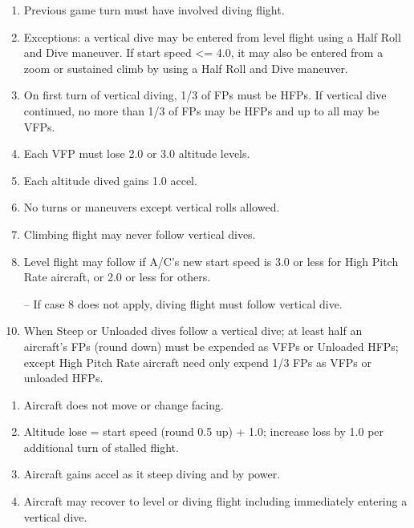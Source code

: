 \begin{table*}
\begin{multicols}{2}

\begin{enumerate}[nosep]
    \item Previous game turn must have involved diving flight.
    \item Exceptions: a vertical dive may be entered from level flight using a Half Roll and Dive maneuver. If start speed <= 4.0, it may also be entered from a zoom or sustained climb by using a Half Roll and Dive maneuver.
    \item On first turn of vertical diving, 1/3 of FPs must be HFPs. If vertical dive continued, no more than 1/3 of FPs may be HFPs and up to all may be VFPs.
    \item Each VFP must lose 2.0 or 3.0 altitude levels.
    \item Each altitude dived gains 1.0 accel.
    \item No turns or maneuvers except vertical rolls allowed.
    \item Climbing flight may never follow vertical dives.
    \item Level flight may follow if A/C's new start speed is 3.0 or less for High Pitch Rate aircraft, or 2.0 or less for others.
    \item[--] If case 8 does not apply, diving flight must follow vertical dive.
    \item When Steep or Unloaded dives follow a vertical dive; at least half an aircraft's FPs (round down) must be expended as VFPs or Unloaded HFPs; except High Pitch Rate aircraft need only expend 1/3 FPs as VFPs or unloaded HFPs.
\end{enumerate}


\begin{enumerate}[nosep]
    \item Aircraft does not move or change facing.
    \item Altitude lose = start speed (round 0.5 up) + 1.0; increase loss by 1.0 per additional turn of stalled flight.
    \item Aircraft gains accel as it steep diving and by power.
    \item Aircraft may recover to level or diving flight including immediately entering a vertical dive.
\end{enumerate}



\end{multicols}
\end{table*}

